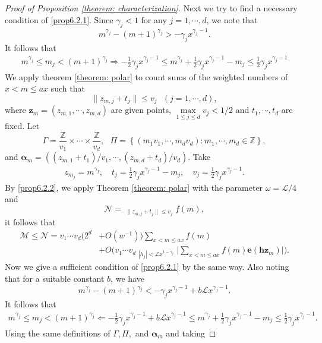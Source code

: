 \documentclass[12pt, reqno, twoside, letterpaper]{amsart}
\numberwithin{equation}{section}
\newcommand{\cL}{\ensuremath{\mathcal{L}}}
\newcommand{\cM}{\ensuremath{\mathcal{M}}}
\newcommand{\cN}{\ensuremath{\mathcal{N}}}
\theoremstyle{customthm}
\theoremstyle{customrem}
\begin{document}
\begin{proof}[Proof of Proposition \ref{theorem: characterization}]
Next we try to find a necessary condition of \eqref{prop6.2.1}. Since $\gamma_j<1$ for any $j=1,\cdots,d$, we note that
$$
m^{\gamma_j} - (m+1)^{\gamma_j} > -\gamma_j x^{\gamma_j-1}.
$$
It follows that
\begin{align}\label{prop6.2.2}
m^{\gamma_j} \leqslant m_j < (m+1)^{\gamma_j} \Rightarrow -\frac{1}{2} \gamma_j x^{\gamma_j-1} \leqslant m^{\gamma_j} + \frac{1}{2} \gamma_j x^{\gamma_j-1} - m_j \leqslant \frac{1}{2} \gamma_j x^{\gamma_j-1}
\end{align}
We apply theorem \ref{theorem: polar} to count sums of the weighted numbers of
$x < m \leqslant ax$ such that
$$
\|z_{m,j}+t_j\|\leqslant v_j\ \ \ (j=1,\cdots,d),
$$
where $\boldsymbol{z}_{m}=(z_{m,1},\cdots,z_{m,d})$ are given points,
$\max\limits_{1\leqslant j\leqslant d}v_j<1/2$
and $t_1,\cdots,t_d$ are fixed. Let
$$
\Gamma=\frac{\mathbb{Z}}{v_1}\times\cdots\times\frac{\mathbb{Z}}{v_d},
\ \ \
\Pi=\left\{(m_1v_1,\cdots,m_dv_d): m_1,\cdots,m_d\in\mathbb{Z}\right\},
$$
and $\boldsymbol{\alpha}_m=((z_{m,1}+t_1)/v_1,\cdots,(z_{m,d}+t_d)/v_d)$. Take
\begin{align*}
 z_{m_{j}} = m^{\gamma_j}, \quad t_j = \frac{1}{2} \gamma_j x^{\gamma_j-1} - m_j, \quad v_j = \frac{1}{2}\gamma_j x^{\gamma_j-1}.
\end{align*}
By \eqref{prop6.2.2}, we apply Theorem \ref{theorem: polar} with the parameter $\omega = \cL/4$ and
$$
\mathcal{N}=\mathop{\sum_{x < m \leqslant ax}}_{\|z_{m,j}+t_j\|\leqslant v_j}f(m),
$$
it follows that
\begin{align*}
\cM \leqslant \cN = v_1\cdots v_d(2^d &+ O(w^{-1}))\sum_{x < m \leqslant ax}f(m)\\
&+O\Bigg(v_1\cdots v_d\mathop{\sum_{\boldsymbol{h}\in\mathbb{Z}^d\setminus\{\boldsymbol{0}\}}}
_{|h_j|<\cL x^{1-\gamma_j}}\Bigg|\sum_{x < m \leqslant ax}f(m)\mathbf{e}(\boldsymbol{h}\boldsymbol{z}_m)
\Bigg|\Bigg).
\end{align*}
Now we give a sufficient condition of \eqref{prop6.2.1} by the same way. Also noting that for a suitable constant $b$, we have
$$
m^{\gamma_j} - (m+1)^{\gamma_j} < -\gamma_j x^{\gamma_j-1} + b\cL x^{\gamma_j-1}.
$$
It follows that
\begin{align}\label{prop6.2.3}
m^{\gamma_j} \leqslant m_j < (m+1)^{\gamma_j} \Leftarrow -\frac{1}{2} \gamma_j x^{\gamma_j-1} + b\cL x^{\gamma_j-1} \leqslant m^{\gamma_j} + \frac{1}{2} \gamma_j x^{\gamma_j-1} - m_j \leqslant \frac{1}{2} \gamma_j x^{\gamma_j-1}.
\end{align}
Using the same definitions of $\Gamma, \Pi,$ and $\boldsymbol{\alpha}_m$ and taking

\end{proof}
\end{document}
